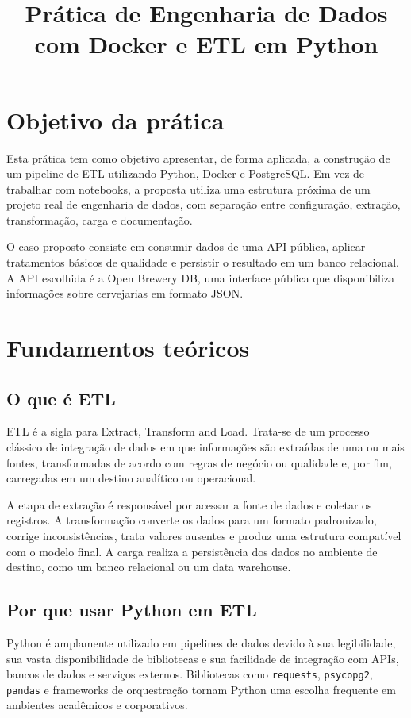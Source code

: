 \documentclass[12pt,a4paper]{article}
\title{Prática de Engenharia de Dados com Docker e ETL em Python}
\author{}
\date{}
\begin{document}
\maketitle

\section{Objetivo da prática}
Esta prática tem como objetivo apresentar, de forma aplicada, a construção de um pipeline de ETL utilizando Python, Docker e PostgreSQL. Em vez de trabalhar com notebooks, a proposta utiliza uma estrutura próxima de um projeto real de engenharia de dados, com separação entre configuração, extração, transformação, carga e documentação.

O caso proposto consiste em consumir dados de uma API pública, aplicar tratamentos básicos de qualidade e persistir o resultado em um banco relacional. A API escolhida é a Open Brewery DB, uma interface pública que disponibiliza informações sobre cervejarias em formato JSON.

\section{Fundamentos teóricos}
\subsection{O que é ETL}
ETL é a sigla para Extract, Transform and Load. Trata-se de um processo clássico de integração de dados em que informações são extraídas de uma ou mais fontes, transformadas de acordo com regras de negócio ou qualidade e, por fim, carregadas em um destino analítico ou operacional.

A etapa de extração é responsável por acessar a fonte de dados e coletar os registros. A transformação converte os dados para um formato padronizado, corrige inconsistências, trata valores ausentes e produz uma estrutura compatível com o modelo final. A carga realiza a persistência dos dados no ambiente de destino, como um banco relacional ou um data warehouse.

\subsection{Por que usar Python em ETL}
Python é amplamente utilizado em pipelines de dados devido à sua legibilidade, sua vasta disponibilidade de bibliotecas e sua facilidade de integração com APIs, bancos de dados e serviços externos. Bibliotecas como \texttt{requests}, \texttt{psycopg2}, \texttt{pandas} e frameworks de orquestração tornam Python uma escolha frequente em ambientes acadêmicos e corporativos.
\end{document}
